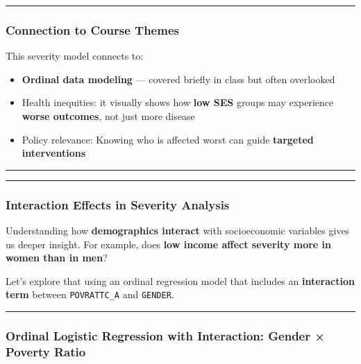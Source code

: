\documentclass[
]{article}
\providecommand{\tightlist}{%
  \setlength{\itemsep}{0pt}\setlength{\parskip}{0pt}}
\begin{document}
\begin{center}\rule{0.5\linewidth}{0.5pt}\end{center}

\subsubsection{Connection to Course
Themes}\label{connection-to-course-themes}

This severity model connects to:

\begin{itemize}
\tightlist
\item
  \textbf{Ordinal data modeling} --- covered briefly in class but often
  overlooked
\item
  Health inequities: it visually shows how \textbf{low SES} groups may
  experience \textbf{worse outcomes}, not just more disease
\item
  Policy relevance: Knowing who is affected worst can guide
  \textbf{targeted interventions}
\end{itemize}

\begin{center}\rule{0.5\linewidth}{0.5pt}\end{center}

\begin{center}\rule{0.5\linewidth}{0.5pt}\end{center}

\subsubsection{Interaction Effects in Severity
Analysis}\label{interaction-effects-in-severity-analysis}

Understanding how \textbf{demographics interact} with socioeconomic
variables gives us deeper insight. For example, does \textbf{low income
affect severity more in women than in men}?

Let's explore that using an ordinal regression model that includes an
\textbf{interaction term} between \texttt{POVRATTC\_A} and
\texttt{GENDER}.

\begin{center}\rule{0.5\linewidth}{0.5pt}\end{center}

\subsubsection{Ordinal Logistic Regression with Interaction: Gender ×
Poverty
Ratio}\label{ordinal-logistic-regression-with-interaction-gender-poverty-ratio}
\end{document}
